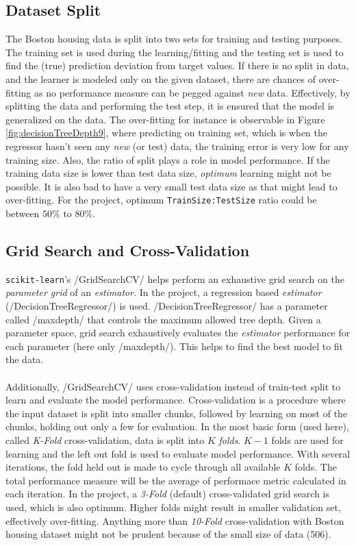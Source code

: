\documentclass{article}
\begin{document}
	\subsection{Dataset Split}	 
	The Boston housing data is split into two sets for training and testing purposes. The training set is used during the learning/fitting and the testing set is used to find the (true) prediction deviation from target values. If there is no split in data, and the learner is modeled only on the given dataset, there are chances of over-fitting as no performance measure can be pegged against \emph{new} data. Effectively, by splitting the data and performing the test step, it is ensured that the model is generalized on the data. The over-fitting for instance is observable in Figure \ref{fig:decisionTreeDepth9}, where predicting on training set, which is when the regressor hasn't seen any \emph{new} (or test) data, the training error is very low for any training size. Also, the ratio of split plays a role in model performance. If the training data size is lower than test data size, \emph{optimum} learning might not be possible. It is also bad to have a very small test data size as that might lead to over-fitting. For the project, optimum \texttt{TrainSize:TestSize} ratio could be between $50\%$ to $80\%$.
	\subsection{Grid Search and Cross-Validation}
	\texttt{scikit-learn}'s \pyinl/GridSearchCV/ helps perform an exhaustive grid search on the \emph{parameter grid} of an \emph{estimator}. In the project, a regression based \emph{estimator} (\pyinl/DecisionTreeRegressor/) is used. \pyinl/DecisionTreeRegressor/ has a parameter called \pyinl/maxdepth/ that controls the maximum allowed tree depth. Given a parameter space, grid search exhaustively evaluates the \emph{estimator} performance for each parameter (here only \pyinl/maxdepth/). This helps to find the best model to fit the data. 
	\paragraph{}Additionally, \pyinl/GridSearchCV/ uses cross-validation instead of train-test split to learn and evaluate the model performance. Cross-validation is a procedure where the input dataset is split into smaller chunks, followed by learning on most of the chunks, holding out only a few for evaluation. In the most basic form (used here), called \emph{K-Fold} cross-validation, data is split into $K$ \emph{folds}. $K-1$ folds are used for learning and the left out fold is used to evaluate model performance. With several iterations, the fold held out is made to cycle through all available $K$ folds. The total performance measure will be the average of performace metric calculated in each iteration. In the project, a \emph{3-Fold} (default) cross-validated grid search is used, which is also optimum. Higher folds might result in smaller validation set, effectively over-fitting. Anything more than \emph{10-Fold} cross-validation with Boston housing dataset might not be prudent because of the small size of data (506).
\end{document}
